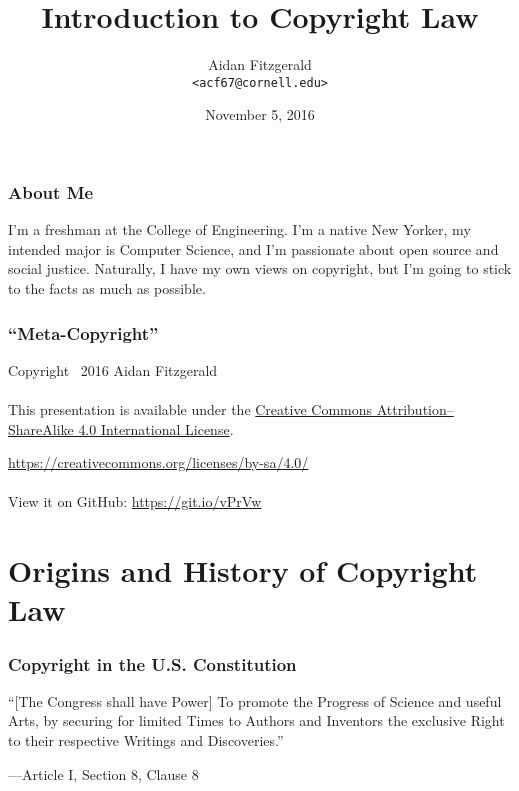 \documentclass{beamer}
\title[Intro to Copyright]{Introduction to Copyright Law}
\author{
Aidan Fitzgerald \\
\texttt{<acf67@cornell.edu>}
}
\date{November 5, 2016}
\begin{document}
\begin{frame}
  \titlepage
\end{frame}

\begin{frame}
  \frametitle{About Me}

  I'm a freshman at the College of Engineering. I'm a native New Yorker,
  my intended major is Computer Science, and I'm passionate about open source
  and social justice. Naturally, I have my own views on copyright, but I'm going
  to stick to the facts as much as possible.

\end{frame}

\begin{frame}
  \frametitle{``Meta-Copyright''}

  Copyright \textcopyright\, 2016 Aidan Fitzgerald
  \\~\\
  This presentation is available under the \href{https://creativecommons.org/licenses/by-sa/4.0/}{Creative
  Commons Attribution--ShareAlike 4.0 International License}.

  \url{https://creativecommons.org/licenses/by-sa/4.0/}
  \\~\\
  View it on GitHub: \url{https://git.io/vPrVw}

\end{frame}

\section[Origins and History]{Origins and History of Copyright Law}

\begin{frame}
  \frametitle{Copyright in the U.S. Constitution}

  ``[The Congress shall have Power] To promote the Progress of Science and useful
  Arts, by securing for limited Times to Authors and Inventors the exclusive
  Right to their respective Writings and Discoveries.''

  \begin{flushright}
    ---Article I, Section 8, Clause 8
  \end{flushright}
\end{frame}
\end{document}

